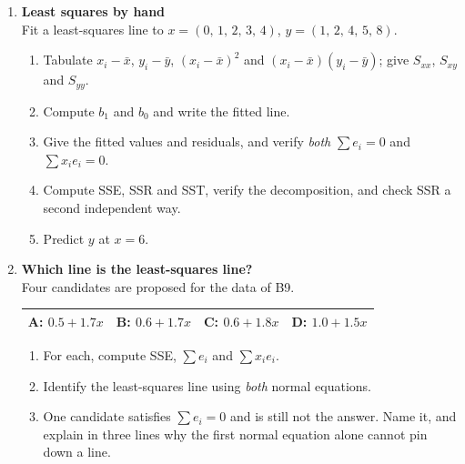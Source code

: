 \documentclass[11pt,a4paper]{article}
\begin{document}
\begin{enumerate}[label=\textbf{B\arabic*.}, leftmargin=*]
  \item \textbf{Least squares by hand} \\
    Fit a least-squares line to $x = (0,\,1,\,2,\,3,\,4)$,
    $y = (1,\,2,\,4,\,5,\,8)$.
    \begin{enumerate}[label=(\alph*), leftmargin=*]
      \item Tabulate $x_i-\bar x$, $y_i-\bar y$, $(x_i-\bar x)^2$ and
        $(x_i-\bar x)(y_i-\bar y)$; give $S_{xx}$, $S_{xy}$ and $S_{yy}$.
      \item Compute $b_1$ and $b_0$ and write the fitted line. 
      \item Give the fitted values and residuals, and verify \emph{both}
        $\sum e_i = 0$ and $\sum x_ie_i = 0$. 
      \item Compute SSE, SSR and SST, verify the decomposition, and check SSR
        a second independent way. 
      \item Predict $y$ at $x = 6$. 
    \end{enumerate}

  \item \textbf{Which line is the least-squares line?} \\
    Four candidates are proposed for the data of B9.
    \begin{center}\begin{tabular}{@{}llll@{}}\toprule
    A: $0.5 + 1.7x$ & B: $0.6 + 1.7x$ & C: $0.6 + 1.8x$ & D: $1.0 + 1.5x$\\
    \bottomrule\end{tabular}\end{center}
    \begin{enumerate}[label=(\alph*), leftmargin=*]
      \item For each, compute SSE, $\sum e_i$ and $\sum x_ie_i$. 
      \item Identify the least-squares line using \emph{both} normal
        equations. 
      \item One candidate satisfies $\sum e_i = 0$ and is still not the
        answer. Name it, and explain in three lines why the first normal
        equation alone cannot pin down a line. 
    \end{enumerate}


\end{enumerate}
\end{document}
